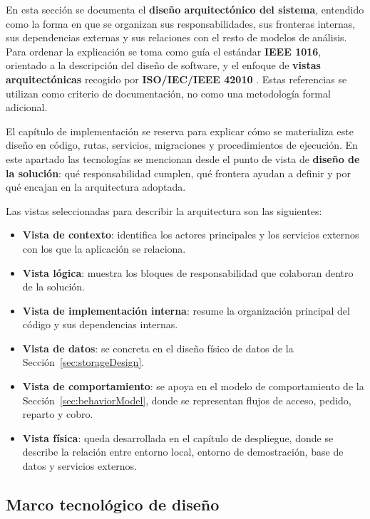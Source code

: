 En esta sección se documenta el \textbf{diseño arquitectónico del sistema}, entendido como la forma en que se organizan sus responsabilidades, sus fronteras internas, sus dependencias externas y sus relaciones con el resto de modelos de análisis. Para ordenar la explicación se toma como guía el estándar \textbf{IEEE 1016}, orientado a la descripción del diseño de software, y el enfoque de \textbf{vistas arquitectónicas} recogido por \textbf{ISO/IEC/IEEE 42010} \citep{ieee1016,iso42010}. Estas referencias se utilizan como criterio de documentación, no como una metodología formal adicional.

El capítulo de implementación se reserva para explicar cómo se materializa este diseño en código, rutas, servicios, migraciones y procedimientos de ejecución. En este apartado las tecnologías se mencionan desde el punto de vista de \textbf{diseño de la solución}: qué responsabilidad cumplen, qué frontera ayudan a definir y por qué encajan en la arquitectura adoptada.

Las vistas seleccionadas para describir la arquitectura son las siguientes:

\begin{itemize}
    \item \textbf{Vista de contexto}: identifica los actores principales y los servicios externos con los que la aplicación se relaciona.
    \item \textbf{Vista lógica}: muestra los bloques de responsabilidad que colaboran dentro de la solución.
    \item \textbf{Vista de implementación interna}: resume la organización principal del código y sus dependencias internas.
    \item \textbf{Vista de datos}: se concreta en el diseño físico de datos de la Sección~\ref{sec:storageDesign}.
    \item \textbf{Vista de comportamiento}: se apoya en el modelo de comportamiento de la Sección~\ref{sec:behaviorModel}, donde se representan flujos de acceso, pedido, reparto y cobro.
    \item \textbf{Vista física}: queda desarrollada en el capítulo de despliegue, donde se describe la relación entre entorno local, entorno de demostración, base de datos y servicios externos.
\end{itemize}

\subsection{Marco tecnológico de diseño}

